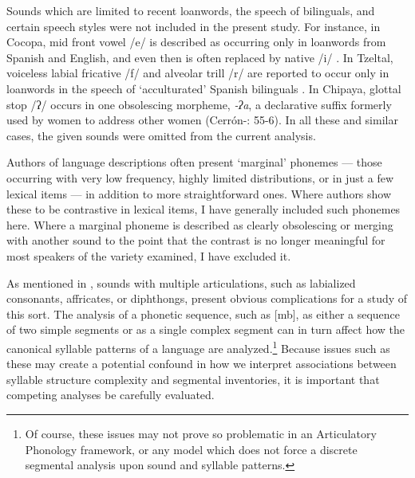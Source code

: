   Sounds which are limited to recent loanwords, the speech of bilinguals, and certain speech styles were not included in the present study. For instance, in Cocopa, mid front vowel /e/ is described as occurring only in loanwords from Spanish and English, and even then is often replaced by native /i/ \citep[26]{Crawford1966}. In Tzeltal, voiceless labial fricative /f/ and alveolar trill /r/ are reported to occur only in loanwords in the speech of ‘acculturated’ Spanish bilinguals \citep[13]{Kaufman1971}. In Chipaya, glottal stop /ʔ/ occurs in one obsolescing morpheme, \textit{-ʔa}, a declarative suffix formerly used by women to address other women (Cerrón-\citealt{Palomino2006}: 55-6). In all these and similar cases, the given sounds were omitted from the current analysis.

  Authors of language descriptions often present ‘marginal’ phonemes — those occurring with very low frequency, highly limited distributions, or in just a few lexical items — in addition to more straightforward ones. Where authors show these to be contrastive in lexical items, I have generally included such phonemes here. Where a marginal phoneme is described as clearly obsolescing or merging with another sound to the point that the contrast is no longer meaningful for most speakers of the variety examined, I have excluded it.

  As mentioned in , sounds with multiple articulations, such as labialized consonants, affricates, or diphthongs, present obvious complications for a study of this sort. The analysis of a phonetic sequence, such as [mb], as either a sequence of two simple segments or as a single complex segment can in turn affect how the canonical syllable patterns of a language are analyzed.\footnote{{Of course, these issues may not prove so problematic in an Articulatory Phonology framework, or any model which does not force a discrete segmental analysis upon sound and syllable patterns.}} Because issues such as these may create a potential confound in how we interpret associations between syllable structure complexity and segmental inventories, it is important that competing analyses be carefully evaluated. 

